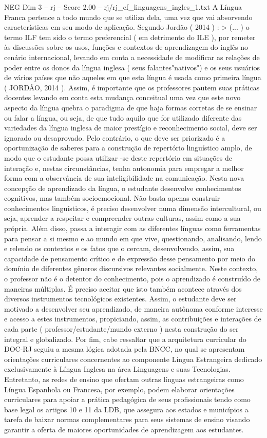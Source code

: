 \begin{textsample}{NEG Dim 3 – rj – Score 2.00 – rj/rj\_ef\_linguagens\_ingles\_1.txt}
A Língua Franca pertence a todo mundo que se utiliza dela, uma vez que vai absorvendo características em seu modo de aplicação.
Segundo Jordão ( 2014 ) : > (... ) o termo ILF tem sido o termo preferencial ( em detrimento do ILE ), por remeter às discussões sobre os usos, funções e contextos de aprendizagem do inglês no cenário internacional, levando em conta a necessidade de modificar as relações de poder entre os donos da língua inglesa ( seus falantes"nativos") e os seus usuários de vários países que não aqueles em que esta língua é usada como primeira língua ( JORDÃO, 2014 ).
Assim, é importante que os professores pautem suas práticas docentes levando em conta esta mudança conceitual uma vez que este novo aspecto da língua quebra o paradigma de que haja formas corretas de se ensinar ou falar a língua, ou seja, de que tudo aquilo que for utilizado diferente das variedades da língua inglesa de maior prestígio e reconhecimento social, deve ser ignorado ou desaprovado.
Pelo contrário, o que deve ser priorizado é a oportunização de saberes para a construção de repertório linguístico amplo, de modo que o estudante possa utilizar -se deste repertório em situações de interação e, nestas circunstâncias, tenha autonomia para empregar a melhor forma com a observância de sua inteligibilidade na comunicação.
Nesta nova concepção de aprendizado da língua, o estudante desenvolve conhecimentos cognitivos, mas também socioemocional.
Não basta apenas construir conhecimentos linguísticos, é preciso desenvolver numa dimensão intercultural, ou seja, aprender a respeitar e compreender outras culturas, assim como a sua própria.
Além disso, passa a interagir com as diferentes línguas como ferramentas para pensar a si mesmo e ao mundo em que vive, questionando, analisando, lendo e relendo os contextos e os fatos que o cercam, desenvolvendo, assim, sua capacidade de pensamento crítico e de expressão desse pensamento por meio do domínio de diferentes gêneros discursivos relevantes socialmente.
Neste contexto, o professor não é o detentor do conhecimento, pois o aprendizado é construído de maneiras múltiplas.
É preciso aceitar que isto também acontece através dos diversos instrumentos tecnológicos existentes.
Assim, o estudante deve ser motivado a desenvolver seu aprendizado, de maneira autônoma conforme interesse e acesso a estes instrumentos, propiciando, assim, as contribuições e interações de cada parte ( professor/estudante/mundo externo ) nesta construção do ser integral e globalizado.
Por fim, cabe ressaltar que a arquitetura curricular do DOC-RJ seguiu a mesma lógica adotada pela BNCC, no qual se apresentam orientações curriculares concernentes ao componente Língua Estrangeira dedicado exclusivamente à Língua Inglesa na área Linguagens e suas Tecnologias.
Entretanto, as redes de ensino que ofertam outras línguas estrangeiras como Língua Espanhola ou Francesa, por exemplo, podem elaborar orientações curriculares para apoiar a prática pedagógica de seus profissionais tendo como base legal os artigos 10 e 11 da LDB, que assegura aos estados e municípios a tarefa de baixar normas complementares para seus sistemas de ensino visando garantir a oferta de maiores oportunidades de aprendizagem aos estudantes.

\end{textsample}
